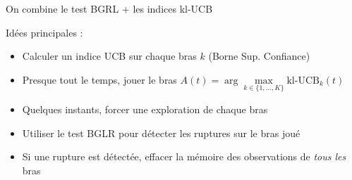 \documentclass[11pt,french,ignorenonframetext,]{beamer}
\begin{document}
\begin{frame}{On combine le test BGRL + les indices kl-UCB}

  Idées principales :

  \begin{itemize}
    \item Calculer un indice UCB sur chaque bras $k$ (Borne Sup. Confiance)
    \pause
    \item Presque tout le temps, jouer le bras $A(t) = \arg\max\limits_{k\in \{1,\dots,K\}} \mbox{kl-UCB}_k(t)$
    \item Quelques instants, forcer une exploration de chaque bras
    \pause
    \item Utiliser le test BGLR \alert{pour détecter les ruptures sur le bras joué}
    \item Si une rupture est détectée, \alert{effacer la mémoire des observations de \emph{tous les} bras}
  \end{itemize}



\end{frame}

\end{document}
